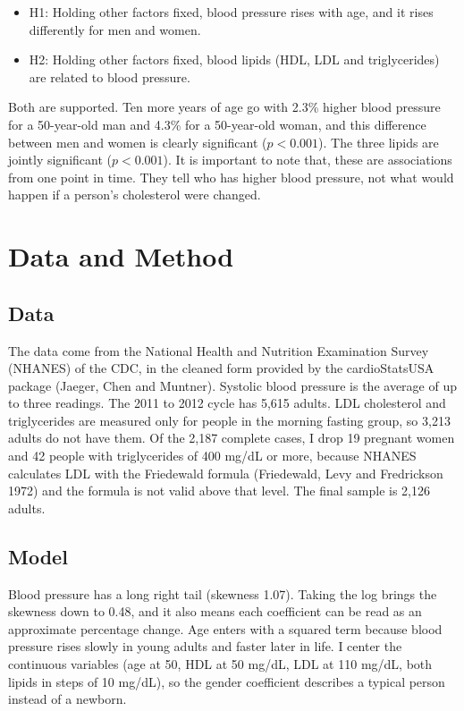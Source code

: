 \documentclass[preprint,letterpaper,11pt,authoryear]{elsarticle}
\begin{document}
\begin{itemize}
  \item H1: Holding other factors fixed, blood pressure rises with age, and it rises differently for men and women.
  \item H2: Holding other factors fixed, blood lipids (HDL, LDL and triglycerides) are related to blood pressure.
\end{itemize}

Both are supported. Ten more years of age go with 2.3\% higher blood pressure for a 50-year-old man and 4.3\% for a 50-year-old woman, and this difference between men and women is clearly significant ($p < 0.001$). The three lipids are jointly significant ($p < 0.001$). It is important to note that, these are associations from one point in time. They tell who has higher blood pressure, not what would happen if a person's cholesterol were changed.

\section{Data and Method}

\subsection{Data}
The data come from the National Health and Nutrition Examination Survey (NHANES) of the CDC, in the cleaned form provided by the cardioStatsUSA package (Jaeger, Chen and Muntner). Systolic blood pressure is the average of up to three readings. The 2011 to 2012 cycle has 5,615 adults. LDL cholesterol and triglycerides are measured only for people in the morning fasting group, so 3,213 adults do not have them. Of the 2,187 complete cases, I drop 19 pregnant women and 42 people with triglycerides of 400 mg/dL or more, because NHANES calculates LDL with the Friedewald formula (Friedewald, Levy and Fredrickson 1972) and the formula is not valid above that level. The final sample is 2,126 adults.

\subsection{Model}
Blood pressure has a long right tail (skewness 1.07). Taking the log brings the skewness down to 0.48, and it also means each coefficient can be read as an approximate percentage change. Age enters with a squared term because blood pressure rises slowly in young adults and faster later in life. I center the continuous variables (age at 50, HDL at 50 mg/dL, LDL at 110 mg/dL, both lipids in steps of 10 mg/dL), so the gender coefficient describes a typical person instead of a newborn.
\end{document}

